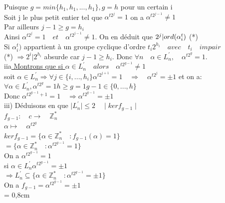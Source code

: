 \documentclass[10pt]{beamer}
\begin{document}
\begin{frame}

Puisque $g = min \{h_1,h_1,...,h_1\}, g=h$ pour un certain i \\
Soit j le plus petit entier tel que $\alpha^{t2^{j}}=1$ on a $\alpha^{t2^{j-1}}\neq1 $\\
Par ailleurs $j-1 \geq g=h_i$\\
Ainsi $ \alpha^{t2^{j}}=1 \quad et \quad \alpha^{t2^{j-1}}\neq1  $. On en d\'eduit que $2^{j} \Huge | ord(\alpha_{i}^t) $  \quad (*)\\

Si $ \alpha_{i}^t)$ appartient \`a un groupe cyclique d'ordre $t_{i}2^{h_i} \quad avec \quad t_i \quad impair$\\

(*) $ \Longrightarrow 2^{i} | 2^{h_i}$ absurde car $j-1 \geq h_i$. Donc $\forall n \quad \alpha \in L^{'}_n,\quad \alpha^{t2^{g}} =1 .$\\

iia\underline{ Montrons que si $ \alpha \in L^{'}_n \quad alors \quad \alpha^{t2^{g-1}} \neq 1$}\\

soit  $ \alpha \in L^{'}_n \Longrightarrow \forall j \in \{i,...,h_{i}\} \alpha^{t2^{j+1}}=1 \quad \Longrightarrow \quad \alpha^{t2^{j}} = \pm 1$ et on a: $\forall \alpha  \in L^{'}_n,\alpha^{t2^{g}}=1 h\geq g =1 g-1 \in \{0,...,h\}$\\
Donc $\alpha^{t2^{g-1}+1} =1 \quad \Longrightarrow \alpha^{t2^{g-1}}= \pm1$\\

iii) D\'eduisons en que $\mid L^{'}_n\mid  \leq 2\quad \mid ker f_{g-1}\mid$\\

$ f_{g-1} : \quad c \longrightarrow \quad \mathbb{Z}_n^*$\\


$ \alpha \longmapsto \quad \alpha^{t2^g}$\\

$ker f_{g-1} = \{\alpha \in \mathbb{Z}_n^* \quad : f_{g-1}(\alpha)=1\}$\\

$=\{\alpha \in \mathbb{Z}_n^* \quad :\alpha^{t2^{g-1}} =1\} $\\

On a $\alpha^{t2^{g-1}} =1$\\
si $ \alpha \in L^{'}_n \alpha^{t2^{g-1}} =\pm1$\\
$\Longrightarrow L^{'}_n \subseteq \{\alpha \in \mathbb{Z}_n^* \quad :\alpha^{t2^{g-1}} =\pm1\}$\\
On a $ f_{g-1}= \alpha^{t2^{g-1}} =\pm1$\\ \parindent = 0,8cm


\end{frame}
\end{document}
